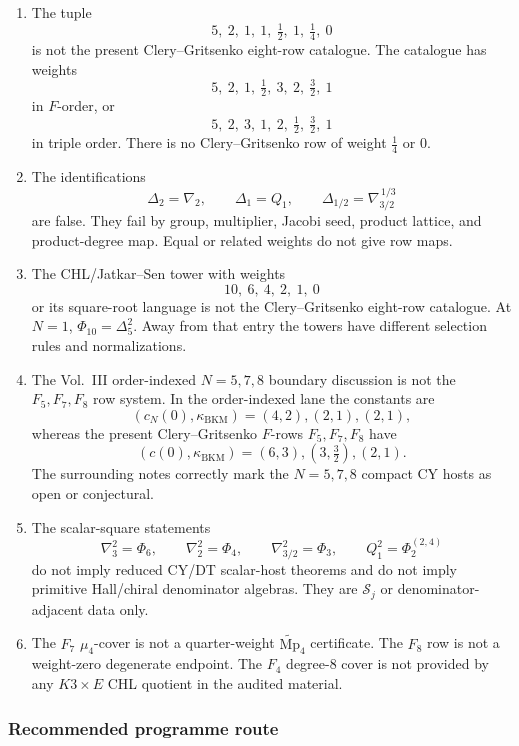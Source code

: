 \begin{enumerate}
\item The tuple
\[
5,\ 2,\ 1,\ 1,\ \tfrac12,\ 1,\ \tfrac14,\ 0
\]
is not the present Clery--Gritsenko eight-row catalogue.  The catalogue
has weights
\[
5,\ 2,\ 1,\ \tfrac12,\ 3,\ 2,\ \tfrac32,\ 1
\]
in \(F\)-order, or
\[
5,\ 2,\ 3,\ 1,\ 2,\ \tfrac12,\ \tfrac32,\ 1
\]
in triple order.  There is no Clery--Gritsenko row of weight
\(\tfrac14\) or \(0\).

\item The identifications
\[
\Delta_2=\nabla_2,\qquad
\Delta_1=Q_1,\qquad
\Delta_{1/2}=\nabla_{3/2}^{\,1/3}
\]
are false.  They fail by group, multiplier, Jacobi seed, product
lattice, and product-degree map.  Equal or related weights do not give
row maps.

\item The CHL/Jatkar--Sen tower with weights
\[
10,\ 6,\ 4,\ 2,\ 1,\ 0
\]
or its square-root language is not the Clery--Gritsenko eight-row
catalogue.  At \(N=1\), \(\Phi_{10}=\Delta_5^2\).  Away from that
entry the towers have different selection rules and normalizations.

\item The Vol.~III order-indexed \(N=5,7,8\) boundary discussion is not
the \(F_5,F_7,F_8\) row system.  In the order-indexed lane the constants
are
\[
(c_N(0),\kappa_{\mathrm{BKM}})=(4,2),(2,1),(2,1),
\]
whereas the present Clery--Gritsenko \(F\)-rows \(F_5,F_7,F_8\) have
\[
(c(0),\kappa_{\mathrm{BKM}})=(6,3),(3,\tfrac32),(2,1).
\]
The surrounding notes correctly mark the \(N=5,7,8\) compact CY
hosts as open or conjectural.

\item The scalar-square statements
\[
\nabla_3^2=\Phi_6,\qquad
\nabla_2^2=\Phi_4,\qquad
\nabla_{3/2}^2=\Phi_3,\qquad
Q_1^2=\Phi_2^{(2,4)}
\]
do not imply reduced CY/DT scalar-host theorems and do not imply
primitive Hall/chiral denominator algebras.  They are \(\mathscr S_j\)
or denominator-adjacent data only.

\item The \(F_7\) \(\mu_4\)-cover is not a quarter-weight
\(\widetilde{\mathrm{Mp}}_4\) certificate.  The \(F_8\) row is not a
weight-zero degenerate endpoint.  The \(F_4\) degree-\(8\) cover is not
provided by any \(K3\times E\) CHL quotient in the audited material.
\end{enumerate}

\subsubsection*{Recommended programme route}


